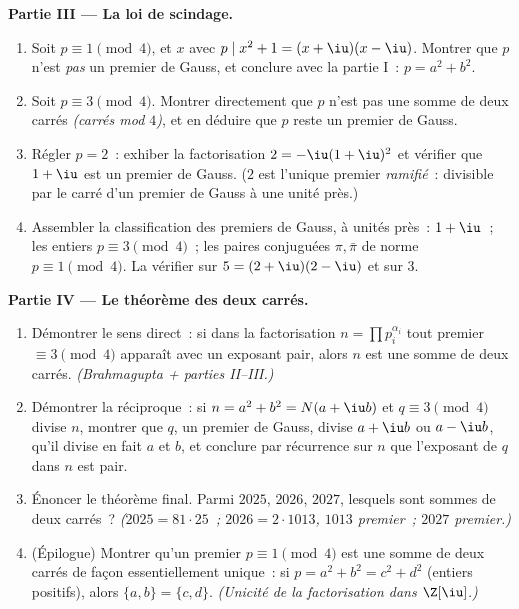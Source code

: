 \begin{problem}
\medskip
\noindent\textbf{Partie III --- La loi de scindage.}
\begin{enumerate}[resume]
  \item Soit $p \equiv 1 \pmod 4$, et $x$ avec $p \mid x^2 + 1 =
        (x + \iu)(x - \iu)$. Montrer que $p$ n'est \emph{pas} un
        premier de Gauss, et conclure avec la partie I~: $p =
        a^2 + b^2$.
  \item Soit $p \equiv 3 \pmod 4$. Montrer directement que $p$
        n'est pas une somme de deux carrés \emph{(carrés mod
        $4$)}, et en déduire que $p$ reste un premier de Gauss.
  \item Régler $p = 2$~: exhiber la factorisation $2 =
        -\iu(1+\iu)^2$ et vérifier que $1 + \iu$ est un premier
        de Gauss. ($2$ est l'unique premier \emph{ramifié}~:
        divisible par le carré d'un premier de Gauss à une unité
        près.)
  \item Assembler la classification des premiers de Gauss, à
        unités près~: $1 + \iu$~; les entiers $p \equiv 3 \pmod
        4$~; les paires conjuguées $\pi, \bar\pi$ de norme $p
        \equiv 1 \pmod 4$. La vérifier sur $5 = (2+\iu)(2-\iu)$
        et sur $3$.
\end{enumerate}

\medskip
\noindent\textbf{Partie IV --- Le théorème des deux carrés.}
\begin{enumerate}[resume]
  \item Démontrer le sens direct~: si dans la factorisation $n =
        \prod p_i^{\alpha_i}$ tout premier $\equiv 3 \pmod 4$
        apparaît avec un exposant pair, alors $n$ est une somme
        de deux carrés. \emph{(Brahmagupta + parties II--III.)}
  \item Démontrer la réciproque~: si $n = a^2 + b^2 = N(a + \iu
        b)$ et $q \equiv 3 \pmod 4$ divise $n$, montrer que $q$,
        un premier de Gauss, divise $a + \iu b$ ou $a - \iu b$,
        qu'il divise en fait $a$ et $b$, et conclure par
        récurrence sur $n$ que l'exposant de $q$ dans $n$ est
        pair.
  \item Énoncer le théorème final. Parmi $2025$, $2026$, $2027$,
        lesquels sont sommes de deux carrés~? \emph{($2025 = 81
        \cdot 25$~; $2026 = 2 \cdot 1013$, $1013$ premier~;
        $2027$ premier.)}
  \item (Épilogue) Montrer qu'un premier $p \equiv 1 \pmod 4$
        est une somme de deux carrés de façon essentiellement
        unique~: si $p = a^2 + b^2 = c^2 + d^2$ (entiers
        positifs), alors $\{a, b\} = \{c, d\}$.
        \emph{(Unicité de la factorisation dans $\Z[\iu]$.)}
\end{enumerate}


\end{problem}
